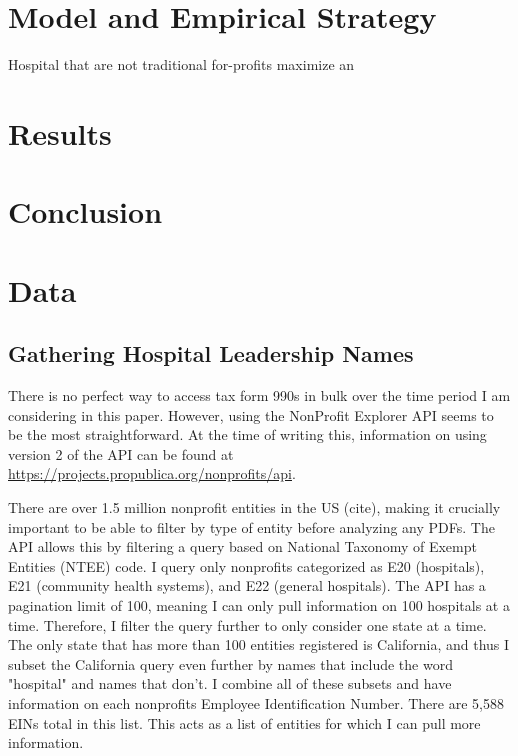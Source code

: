 \documentclass[12pt]{article}
\begin{document}
    \section{Model and Empirical Strategy}

    Hospital that are not traditional for-profits maximize an 

    \section{Results}

    \section{Conclusion}

	
	\newpage
	\appendix

    \section{Data}\label{appendixdata}

    \subsection{Gathering Hospital Leadership Names}

    There is no perfect way to access tax form 990s in bulk over the time period I am considering in this paper. However, using the NonProfit Explorer API seems to be the most straightforward. At the time of writing this, information on using version 2 of the API can be found at \hyperlink{https://projects.propublica.org/nonprofits/api}{https://projects.propublica.org/nonprofits/api}. 
    
    There are over 1.5 million nonprofit entities in the US (cite), making it crucially important to be able to filter by type of entity before analyzing any PDFs. The API allows this by filtering a query based on National Taxonomy of Exempt Entities (NTEE) code. I query only nonprofits categorized as E20 (hospitals), E21 (community health systems), and E22 (general hospitals). The API has a pagination limit of 100, meaning I can only pull information on 100 hospitals at a time. Therefore, I filter the query further to only consider one state at a time. The only state that has more than 100 entities registered is California, and thus I subset the California query even further by names that include the word "hospital" and names that don't. I combine all of these subsets and have information on each nonprofits Employee Identification Number. There are 5,588 EINs total in this list. This acts as a list of entities for which I can pull more information. 
\end{document}
